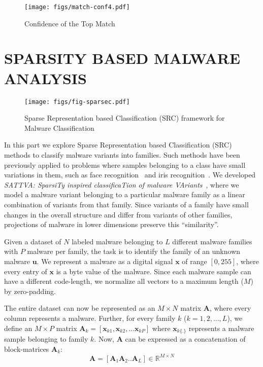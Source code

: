\documentclass[journal]{IEEEtran}
\begin{document}
\begin{figure}[h]
\centering
{\texttt{[image: figs/match-conf4.pdf]}}
\caption{Confidence of the Top Match}
\label{match-conf}
\vspace{-10pt}
\end{figure}


\section*{SPARSITY BASED MALWARE ANALYSIS} 


\begin{figure*}[ht]
\centering
{\texttt{[image: figs/fig-sparsec.pdf]}}
\vspace{-10pt}
\caption{Sparse Representation based Classification (SRC) framework for Malware Classification}
\label{fig-sp}
\vspace{-10pt}
\end{figure*}



In this part we explore Sparse Representation based Classification (SRC) methods to classify malware variants into families. 
Such methods have been previously applied to problems where samples belonging to a class have small variations in them, such as face recognition~\cite{2009-pami-wright-face} and iris recognition~\cite{2011-jay-pami}.
We developed \emph{SATTVA: SparsiTy inspired classificaTion of malware VAriants}~\cite{sattva}, where we model a malware variant belonging to a particular malware family as a linear combination of variants from that family.
Since variants of a family have small changes in the overall structure and differ from variants of other families, projections of malware in lower dimensions preserve this ``similarity''. 

Given a dataset of $N$ labeled malware belonging to $L$ different malware families with $P$ malware per family, the task is to identify the family of an unknown malware $\mathbf{u}$.
We represent a malware as a digital signal $\mathbf{x}$ of range $[0,255]$, where every entry of $\mathbf{x}$ is a byte value of the malware.  
Since each malware sample can have a different code-length, we normalize all vectors to a  maximum length ($M$) by zero-padding.

The entire dataset can now be represented as an $M \times N$ matrix $\mathbf{A}$, where every column represents a malware. Further, for every family $k$ ($k = 1,2, ... ,L$), we define an $M \times P$ matrix $\mathbf{A}_k = [\mathbf{x}_{k1},\mathbf{x}_{k2},...\mathbf{x}_{kP}]$ where $\mathbf{x}_{k\{.\}}$ represents a malware sample belonging to family $k$. Now, $\mathbf{A}$ can be expressed as a concatenation of block-matrices $\mathbf{A}_k$:
\begin{equation}
\mathbf{A} = [\mathbf{A}_1 \mathbf{A}_2 .. \mathbf{A}_L] \in {\mathbb{R}}^{M \times N}
\label{mat-form}
\end{equation} 
\end{document}
